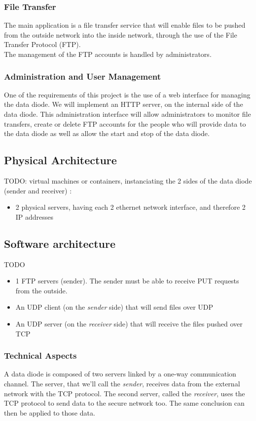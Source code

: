 \documentclass[a4paper,11pt]{article}
\begin{document}
\subsubsection{File Transfer}
The main application is a file transfer service that will enable files to be pushed from the outside network into the inside network, through the use of the File Transfer Protocol (FTP).\\

The management of the FTP accounts is handled by administrators.

\subsubsection{Administration and User Management}
One of the requirements of this project is the use of a web interface for managing the data diode. We will implement an HTTP server, on the internal side of the data diode. This administration interface will allow administrators to monitor file transfers, create or delete FTP accounts for the people who will provide data to the data diode as well as allow the start and stop of the data diode.

\subsection{Physical Architecture}
TODO: virtual machines or containers, instanciating the 2 sides of the data diode (sender and receiver) :
\begin{itemize}
\item{2 physical servers, having each 2 ethernet network interface, and therefore 2 IP addresses}

\end{itemize}

\subsection{Software architecture}
TODO
\begin{itemize}
\item{1 FTP servers (sender). The sender must be able to receive PUT requests from the outside.}
\item{An UDP client (on the \textit{sender} side) that will send files over UDP}
\item{An UDP server (on the \textit{receiver }side)} that will receive the files pushed over TCP
\end{itemize}
\subsubsection{Technical Aspects}
A data diode is composed of two servers linked by a one-way communication channel. The server, that we'll call the \textit{sender}, receives data from the external network with the TCP protocol. The second server, called the \textit{receiver}, uses the TCP protocol to send data to the secure network too. The same conclusion can then be applied to those data.\\
\end{document}
